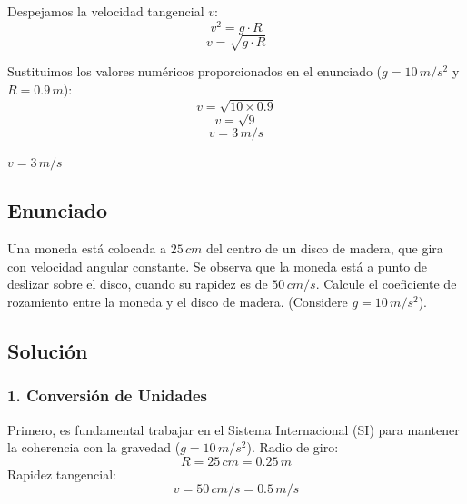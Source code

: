 \documentclass[12pt, a4paper]{article}
\begin{document}
Despejamos la velocidad tangencial $v$:
$$ v^2 = g \cdot R $$
$$ v = \sqrt{g \cdot R} $$

Sustituimos los valores numéricos proporcionados en el enunciado ($g = 10 \, \si{m/s^2}$ y $R = 0.9 \, \si{m}$):
$$ v = \sqrt{10 \times 0.9} $$
$$ v = \sqrt{9} $$
$$ v = 3 \, \si{m/s} $$

\begin{tcolorbox}[colback=green!5!white, colframe=green!50!black, title=Respuesta Final]
\centering \Large $v = 3 \, \si{m/s}$
\end{tcolorbox}

\newpage

\subsection*{Enunciado}
Una moneda está colocada a $25 \, \si{cm}$ del centro de un disco de madera, que gira con velocidad angular constante. Se observa que la moneda está a punto de deslizar sobre el disco, cuando su rapidez es de $50 \, \si{cm/s}$. Calcule el coeficiente de rozamiento entre la moneda y el disco de madera. (Considere $g = 10 \, \si{m/s^2}$).

\begin{center}
\end{center}

\subsection*{Solución}

\subsubsection*{1. Conversión de Unidades}
Primero, es fundamental trabajar en el Sistema Internacional (SI) para mantener la coherencia con la gravedad ($g = 10\,\si{m/s^2}$).
Radio de giro:
$$ R = 25 \, \si{cm} = 0.25 \, \si{m} $$
Rapidez tangencial:
$$ v = 50 \, \si{cm/s} = 0.5 \, \si{m/s} $$
\end{document}
